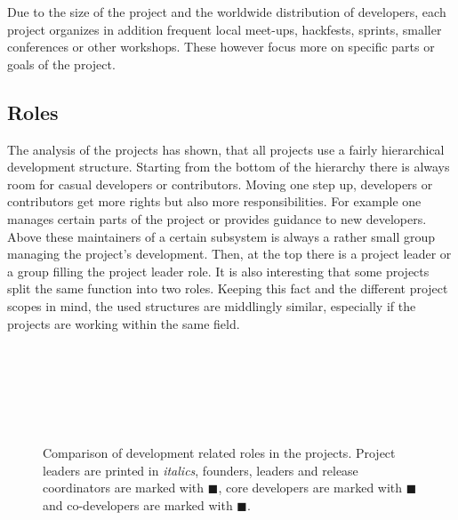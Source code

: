 Due to the size of the project and the worldwide distribution of developers,
each project organizes in addition frequent local meet-ups, hackfests, sprints,
smaller conferences or other workshops. These however focus more on
specific parts or goals of the project.


\subsection{Roles} %

The analysis of the projects has shown, that all projects use a fairly
hierarchical development structure. Starting from the bottom of the hierarchy
there is always room for casual developers or contributors. Moving one step up,
developers or contributors get more rights but also more responsibilities. For
example one manages certain parts of the project or provides guidance to new
developers. Above these maintainers of a certain subsystem is always a rather
small group managing the project's development. Then, at the top there is a
project leader or a group filling the project leader role. It is also
interesting that some projects split the same function into two roles. Keeping
this fact and the different project scopes in mind, the used structures are
middlingly similar, especially if the projects are working within the same
field.

\begin{figure}[htbp]
  \centering
   \qquad
   \\

   \qquad
   \\

   \qquad
   \\

   \qquad
   \\

   \qquad
   \\
  \caption[Comparison of Development Related Roles]
  {Comparison of development related roles in the projects. Project leaders are
    printed in \emph{italics}, founders, leaders and release coordinators are
    marked with \textcolor{skyblue3!110}{$\blacksquare$}, core developers are
    marked with \textcolor{skyblue2}{$\blacksquare$} and co-developers are
    marked with \textcolor{skyblue1}{$\blacksquare$}.}
\end{figure}

